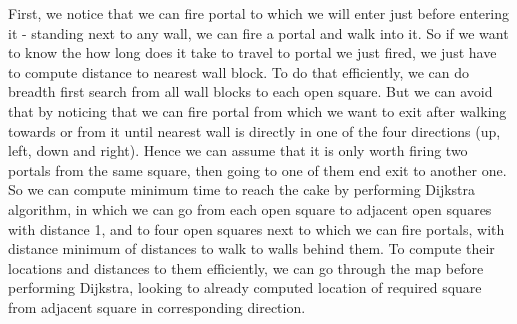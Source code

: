 First, we notice that we can fire portal to which we will enter just before entering it - standing next to any wall, we can fire a portal and walk into it. So if we want to know the how long does it take to travel to portal we just fired, we just have to compute distance to nearest wall block. To do that efficiently, we can do breadth first search from all wall blocks to each open square. But we can avoid that by noticing that we can fire portal from which we want to exit after walking towards or from it until nearest wall is directly in one of the four directions (up, left, down and right). Hence we can assume that it is only worth firing two portals from the same square, then going to one of them end exit to another one.
So we can compute minimum time to reach the cake by performing Dijkstra algorithm, in which we can go from each open square to adjacent open squares with distance 1, and to four open squares next to which we can fire portals, with distance minimum of distances to walk to walls behind them. To compute their locations and distances to them efficiently, we can go through the map before performing Dijkstra, looking to already computed location of required square from adjacent square in corresponding direction.